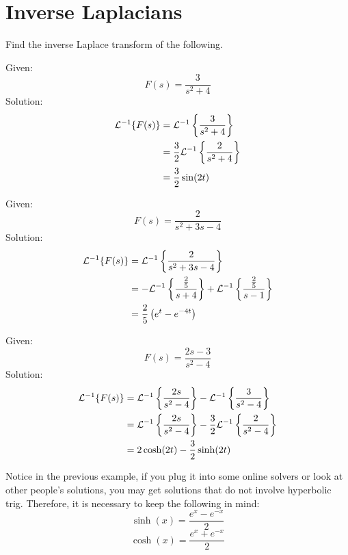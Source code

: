 \documentclass[diffeq.tex]{subfiles}
\begin{document}
\section{Inverse Laplacians}
Find the inverse Laplace transform of the following.
\begin{homework*}[255.1]
    Given:
    \begin{equation}
        F(s) = \frac{3}{s^{2} + 4}
    \end{equation}
    Solution:
    \begin{alignat}{1}
        \mathcal{L}^{-1}\{F(s)\} &= \mathcal{L}^{-1}\left\{\frac{3}{s^{2} + 4}\right\}\\
        &= \frac{3}{2}\mathcal{L}^{-1}\left\{\frac{2}{s^{2} + 4}\right\}\\
        &= \frac{3}{2}\sin(2t)
    \end{alignat}
\end{homework*}
\begin{homework*}[255.3]
    Given:
    \begin{equation}
        F(s) = \frac{2}{s^{2} + 3s - 4}
    \end{equation}
    Solution:
    \begin{alignat}{1}
        \mathcal{L}^{-1}\{F(s)\} &= \mathcal{L}^{-1}\left\{\frac{2}{s^{2} + 3s - 4}\right\}\\
        &= -\mathcal{L}^{-1}\left\{\frac{\frac{2}{5}}{s + 4}\right\} + \mathcal{L}^{-1}\left\{\frac{\frac{2}{5}}{s - 1}\right\}\\
        &= \frac{2}{5}\left(e^{t}-e^{-4t}\right)
    \end{alignat}
\end{homework*}
\begin{homework*}[255.5]
    Given:
    \begin{equation}
        F(s) = \frac{2s-3}{s^{2} - 4}
    \end{equation}
    Solution:
    \begin{alignat}{1}
        \mathcal{L}^{-1}\{F(s)\} &= \mathcal{L}^{-1}\left\{\frac{2s}{s^{2}-4}\right\} - \mathcal{L}^{-1}\left\{\frac{3}{s^{2} - 4}\right\}\\
        &= \mathcal{L}^{-1}\left\{\frac{2s}{s^{2}-4}\right\} - \frac{3}{2}\mathcal{L}^{-1}\left\{\frac{2}{s^{2} - 4}\right\}\\
        &= 2\cosh(2t) - \frac{3}{2}\sinh(2t)
    \end{alignat}
\end{homework*}
\begin{remark}
    Notice in the previous example, if you plug it into some online solvers or look at other people's solutions, you may get solutions that do not involve hyperbolic trig. Therefore, it is necessary to keep the following in mind:
    \begin{equation}
        \sinh(x) = \frac{e^{x} - e^{-x}}{2}
    \end{equation}
    \begin{equation}
        \cosh(x) = \frac{e^{x} + e^{-x}}{2}
    \end{equation}
\end{remark}
\end{document}
